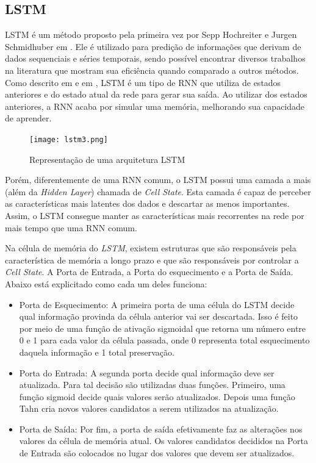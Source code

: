 \subsection{\acrfull{LSTM}}

\acrshort{LSTM} é um método proposto pela primeira vez por Sepp Hochreiter e Jurgen Schmidhuber em \cite{Sepp_1997}. Ele é utilizado para predição de informações que derivam de dados sequenciais e séries temporais, sendo possível encontrar diversos trabalhos na literatura que mostram sua eficiência quando comparado a outros métodos. Como descrito em \cite{Zainab_2018} e em \cite{Xiaolei_2015}, \acrshort{LSTM} é um tipo de \acrshort{RNN} que utiliza de estados anteriores e do estado atual da rede para gerar sua saída. Ao utilizar dos estados anteriores, a \acrshort{RNN} acaba por simular uma memória, melhorando sua capacidade de aprender. 

\begin{figure}[htbp]
    \centering
    \texttt{[image: lstm3.png]}
    \label{figure:eixo}
    \caption[Representação de uma arquitetura LSTM]{Representação de uma arquitetura LSTM\footnotemark}
\end{figure}


Porém, diferentemente de uma \acrshort{RNN} comum, o LSTM possui uma camada a mais (além da \textit{Hidden Layer}) chamada de \textit{Cell State}. Esta camada é capaz de perceber as características mais latentes dos dados e descartar as menos importantes. Assim, o \acrshort{LSTM} consegue manter as características mais recorrentes na rede por mais tempo que uma \acrshort{RNN} comum. 

Na célula de memória do \textit{\acrshort{LSTM}}, existem estruturas que são responsáveis pela característica de memória a longo prazo e que são responsáveis por controlar a \textit{Cell State}. A Porta de Entrada, a Porta do esquecimento e a Porta de Saída. Abaixo está explicitado como cada um deles funciona:
\begin{itemize}
  \item Porta de Esquecimento: A primeira porta de uma célula do \acrfull{LSTM} decide qual informação provinda da célula anterior vai ser descartada. Isso é feito por meio de uma função de ativação sigmoidal que retorna um número entre 0 e 1 para cada valor da célula passada, onde 0 representa total esquecimento daquela informação e 1 total preservação.
  
  \item Porta do Entrada: A segunda porta decide qual informação deve ser atualizada. Para tal decisão são utilizadas duas funções. Primeiro, uma função sigmoid decide quais valores serão atualizados. Depois uma função Tahn cria novos valores candidatos a serem utilizados na atualização.
  \item Porta de Saída: Por fim, a porta de saída efetivamente faz as alterações nos valores da célula de memória atual. Os valores candidatos decididos na Porta de Entrada são colocados no lugar dos valores que devem ser atualizados.
\end{itemize}

